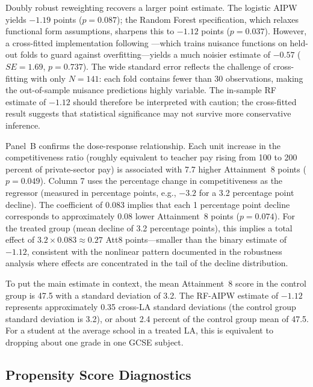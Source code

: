 \documentclass[12pt]{article}
\begin{document}
Doubly robust reweighting recovers a larger point estimate. The logistic AIPW yields $-1.19$ points ($p = 0.087$); the Random Forest specification, which relaxes functional form assumptions, sharpens this to $-1.12$ points ($p = 0.037$). However, a cross-fitted implementation following \citet{chernozhukov2018double}---which trains nuisance functions on held-out folds to guard against overfitting---yields a much noisier estimate of $-0.57$ ($SE = 1.69$, $p = 0.737$). The wide standard error reflects the challenge of cross-fitting with only $N = 141$: each fold contains fewer than 30 observations, making the out-of-sample nuisance predictions highly variable. The in-sample RF estimate of $-1.12$ should therefore be interpreted with caution; the cross-fitted result suggests that statistical significance may not survive more conservative inference.

Panel~B confirms the dose-response relationship. Each unit increase in the competitiveness ratio (roughly equivalent to teacher pay rising from 100 to 200 percent of private-sector pay) is associated with 7.7 higher Attainment~8 points ($p = 0.049$). Column 7 uses the percentage change in competitiveness as the regressor (measured in percentage points, e.g., $-3.2$ for a 3.2 percentage point decline). The coefficient of 0.083 implies that each 1 percentage point decline corresponds to approximately 0.08 lower Attainment~8 points ($p = 0.074$). For the treated group (mean decline of 3.2 percentage points), this implies a total effect of $3.2 \times 0.083 \approx 0.27$ Att8 points---smaller than the binary estimate of $-1.12$, consistent with the nonlinear pattern documented in the robustness analysis where effects are concentrated in the tail of the decline distribution.

To put the main estimate in context, the mean Attainment~8 score in the control group is 47.5 with a standard deviation of 3.2. The RF-AIPW estimate of $-1.12$ represents approximately 0.35 cross-LA standard deviations (the control group standard deviation is 3.2), or about 2.4 percent of the control group mean of 47.5. For a student at the average school in a treated LA, this is equivalent to dropping about one grade in one GCSE subject.

\subsection{Propensity Score Diagnostics}
\end{document}
